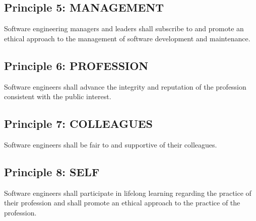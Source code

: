\subsection*{Principle 5: MANAGEMENT}
Software engineering managers and leaders shall subscribe to and promote an
ethical approach to the management of software development and maintenance.

\subsection*{Principle 6: PROFESSION}
Software engineers shall advance the integrity and reputation of the profession
consistent with the public interest.

\subsection*{Principle 7: COLLEAGUES}
Software engineers shall be fair to and supportive of their colleagues.

\subsection*{Principle 8: SELF}
Software engineers shall participate in lifelong learning regarding the
practice of their profession and shall promote an ethical approach to the
practice of the profession.
